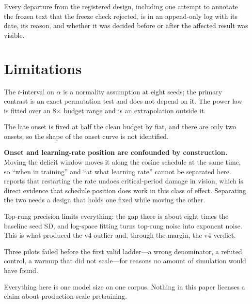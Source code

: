 \documentclass[11pt]{article}
\begin{document}
Every departure from the registered design, including one attempt to annotate the
frozen text that the freeze check rejected, is in an append-only log with its date,
its reason, and whether it was decided before or after the affected result was
visible.

\section*{Limitations}

The $t$-interval on $\alpha$ is a normality assumption at eight seeds; the primary
contrast is an exact permutation test and does not depend on it. The power law is
fitted over an 8$\times$ budget range and is an extrapolation outside it.

The late onset is fixed at half the clean budget by fiat, and there are only two
onsets, so the shape of the onset curve is not identified.

\textbf{Onset and learning-rate position are confounded by construction.} Moving
the deficit window moves it along the cosine schedule at the same time, so ``when
in training'' and ``at what learning rate'' cannot be separated here.
\citet{pawlak2025occurence} reports that restarting the rate undoes
critical-period damage in vision, which is direct evidence that schedule position
does work in this class of effect. Separating the two needs a design that holds one
fixed while moving the other.

Top-rung precision limits everything: the gap there is about eight times the
baseline seed SD, and log-space fitting turns top-rung noise into exponent noise.
This is what produced the v4 outlier and, through the margin, the v4 verdict.

Three pilots failed before the first valid ladder---a wrong denominator, a refuted
control, a warmup that did not scale---for reasons no amount of simulation would
have found.

Everything here is one model size on one corpus. Nothing in this paper licenses a
claim about production-scale pretraining.


\end{document}
